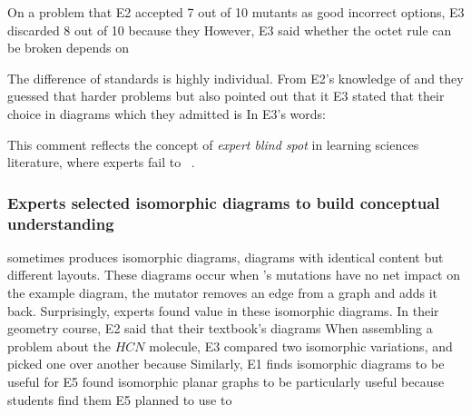 On a problem that E2 accepted 7 out of 10 mutants as good incorrect options, E3 discarded 8 out of 10 because they  However, E3 said whether the octet rule can be broken depends on 

The difference of standards is highly individual. From E2's knowledge of  and  they guessed that harder problems  but also pointed out that it  E3 stated that their choice in diagrams  which they admitted is   In E3's words:  

This comment reflects the concept of \textit{expert blind spot} in learning sciences literature, where experts fail to  ~\cite{expertBlindspot}.

\subsubsection{Experts selected isomorphic diagrams to build conceptual understanding}
\label{sec:isomorphic-diagrams}

\Edgeworth sometimes produces isomorphic diagrams, \ie diagrams with identical content but different layouts. These diagrams occur when \Edgeworth's mutations have no net impact on the example diagram, \eg the mutator removes an edge from a graph and adds it back. Surprisingly, experts found value in these isomorphic diagrams. 
In their geometry course, E2 said that their textbook's diagrams  When assembling a problem about the $HCN$ molecule, E3 compared two isomorphic variations, and picked one over another because   Similarly, E1 finds isomorphic diagrams to be useful for  
E5 found isomorphic planar graphs to be particularly useful because students find them  E5 planned to use \Edgeworth to 

